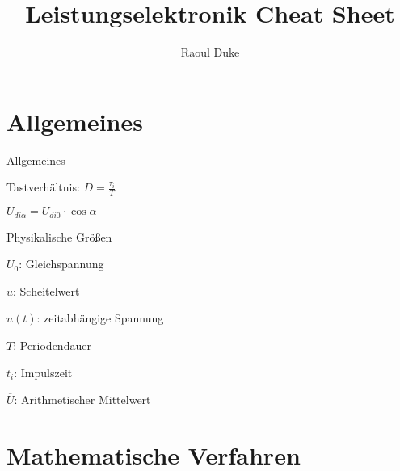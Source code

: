 \documentclass[german]{latex4ei/latex4ei_sheet}
\title{Leistungselektronik Cheat Sheet}
\author{Raoul Duke}
\begin{document}
\maketitle   %

\section{Allgemeines}
	\begin{sectionbox}
		\begin{symbolbox}{Allgemeines}
			\item Tastverhältnis: $D = \frac{\tau_i}{T}$
			\item $U_{di\alpha} = U_{di0} \cdot \cos\alpha$
		\end{symbolbox}
		\begin{bluebox}{Physikalische Größen}
			\item $U_0$: Gleichspannung
			\item $\hat{u}$: Scheitelwert
			\item $u(t)$: zeitabhängige Spannung
			\item $T$: Periodendauer
			\item $t_i$: Impulszeit
			\item $\overline{U}$: Arithmetischer Mittelwert
		\end{bluebox}
	\end{sectionbox}
\section{Mathematische Verfahren}
\end{document}
